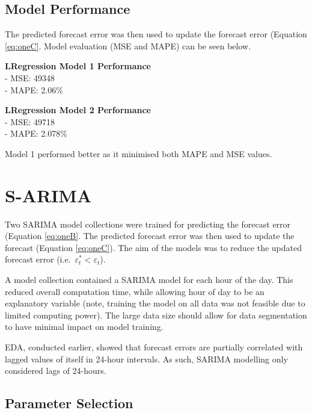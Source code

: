 \documentclass[mstat,12pt]{unswthesis}
\begin{document}
\subsection{Model Performance}\label{model-performance}

The predicted forecast error was then used to update the forecast error (Equation \eqref{eq:oneC}. Model evaluation (MSE and MAPE) can be seen below.

\begin{multicols}{2}
\noindent\textbf{LRegression Model 1 Performance} \\
- MSE: 49348 \\
- MAPE: 2.06\% \\


\columnbreak


\noindent\textbf{LRegression Model 2 Performance} \\
- MSE: 49718\\
- MAPE: 2.078\%\\
\end{multicols}

Model 1 performed better as it minimised both MAPE and MSE values.

\section{S-ARIMA}\label{s-arima}

Two SARIMA model collections were trained for predicting the forecast error (Equation \eqref{eq:oneB}. The predicted forecast error was then used to update the forecast (Equation \eqref{eq:oneC}). The aim of the models was to reduce the updated forecast error (i.e.~\(\varepsilon^{*}_{t} < \varepsilon_t\)).

\bigskip

A model collection contained a SARIMA model for each hour of the day. This reduced overall computation time, while allowing hour of day to be an explanatory variable (note, training the model on all data was not feasible due to limited computing power). The large data size should allow for data segmentation to have minimal impact on model training.

\bigskip

EDA, conducted earlier, showed that forecast errors are partially correlated with lagged values of itself in 24-hour intervals. As such, SARIMA modelling only considered lags of 24-hours.

\subsection{Parameter Selection}\label{parameter-selection}
\end{document}
